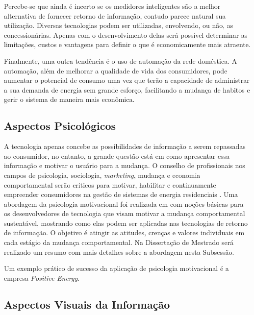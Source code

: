 Percebe-se que ainda é incerto se os medidores inteligentes são a melhor 
alternativa de fornecer retorno de informação, contudo parece natural sua 
utilização. Diversas tecnologias podem ser utilizadas, envolvendo, ou não, as 
concessionárias. Apenas com o desenvolvimento delas será
possível determinar as limitações, custos e vantagens para definir o que é 
economicamente mais atraente.

Finalmente, uma outra tendência é o uso de automação da rede doméstica. A 
automação, além de melhorar a qualidade de vida dos consumidores, 
pode aumentar o potencial de consumo uma vez que terão a capacidade de 
administrar a sua demanda de energia sem grande esforço, 
facilitando a mudança de habitos e gerir o sistema de maneira mais econômica.

\subsection{Aspectos Psicológicos}
\label{ssec:asp_psic}

A tecnologia apenas concebe as possibilidades de informação a
serem repassadas ao consumidor, no entanto, a grande questão está em como
apresentar essa informação e motivar o usuário para a mudança. 
O conselho de profissionais nos campos de psicologia, sociologia,
\emph{marketing}, mudança e economia comportamental serão criticos para
motivar, habilitar e continuamente empreender consumidores na gestão de sistemas 
de energia residenciais \cite{aceee_2010_estudos_feedback}. 
Uma abordagem da psicologia motivacional foi realizada em
\cite{2010_aspectos_psicologicos_usa} com noções básicas para os desenvolvedores 
de tecnologia que visam motivar a mudança comportamental sustentável, mostrando
como elas podem ser aplicadas nas tecnologias de retorno de informação. O
objetivo é atingir as atitudes, crenças e valores individuais em cada estágio da
mudança comportamental. Na Dissertação de Mestrado será realizado um resumo com
mais detalhes sobre a abordagem nesta Subsessão.

Um exemplo prático de sucesso da aplicação de psicologia motivacional é a empresa
\emph{Positive Energy}.


\subsection{Aspectos Visuais da Informação}
\label{ssec:asp_visuais}

